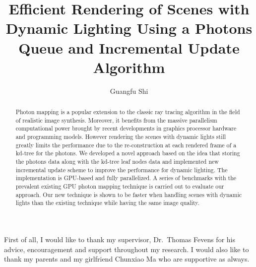 \documentclass[12pt]{report}
\author{Guangfu Shi}
\title{Efficient Rendering of Scenes with Dynamic Lighting
             Using a Photons Queue and Incremental Update Algorithm}
\begin{document}
\begin{abstract}

Photon mapping is a popular extension to the classic ray tracing algorithm in the field
of realistic image synthesis. Moreover, it benefits from the massive parallelism
computational power brought by recent developments in graphics processor hardware and
programming models. However rendering the scenes with dynamic lights still greatly limits
the performance due to the re-construction at each rendered frame of a kd-tree for the
photons. We developed a novel approach based on the idea that storing the photons data
along with the kd-tree leaf nodes data and implemented new incremental update scheme to
improve the performance for dynamic lighting. The implementation is GPU-based and fully
parallelized. A series of benchmarks with the prevalent existing GPU photon mapping
technique is carried out to evaluate our approach. Our new technique is shown to be
faster when handling scenes with dynamic lights than the existing technique while having
the same image quality.

\end{abstract}


\begin{acknowledgments}
First of all, I would like to thank my supervisor, Dr.~Thomas Fevens for his advice, encouragement and support throughout my research. I would also like to thank my parents and my girlfriend Chunxiao Ma who are supportive as always.
\end{acknowledgments}


\setcounter{page}{1}

\begin{spacing}{2.0}
	








	

		

%				




\end{spacing}
\end{document}
